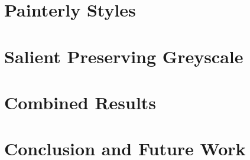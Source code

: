 \documentclass[10pt,twocolumn]{article}
\begin{document}
\section{Painterly Styles}
	\paragraph{}

\section{Salient Preserving Greyscale}
	\paragraph{}

\section{Combined Results}
	\paragraph{}

\section{Conclusion and Future Work}
	\paragraph{}

\nocite{*}


\end{document}
